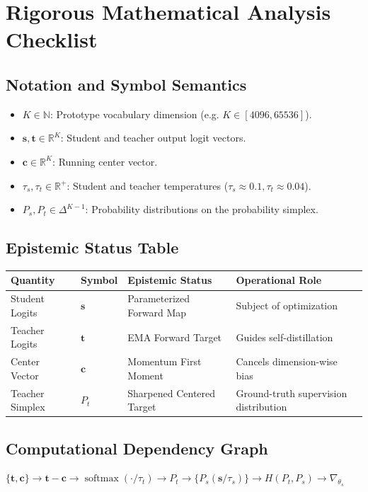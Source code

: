 \documentclass[11pt,a4paper]{article}
\theoremstyle{definition}
\begin{document}
\section{Rigorous Mathematical Analysis Checklist}

\subsection{Notation and Symbol Semantics}
\begin{itemize}
    \item $K \in \mathbb{N}$: Prototype vocabulary dimension (e.g. $K \in [4096, 65536]$).
    \item $\mathbf{s}, \mathbf{t} \in \mathbb{R}^K$: Student and teacher output logit vectors.
    \item $\mathbf{c} \in \mathbb{R}^K$: Running center vector.
    \item $\tau_s, \tau_t \in \mathbb{R}^+$: Student and teacher temperatures ($\tau_s \approx 0.1, \tau_t \approx 0.04$).
    \item $P_s, P_t \in \Delta^{K-1}$: Probability distributions on the probability simplex.
\end{itemize}

\subsection{Epistemic Status Table}
\begin{table}[h]
\centering
\small
\begin{tabular}{@{}llll@{}}
\toprule
\textbf{Quantity} & \textbf{Symbol} & \textbf{Epistemic Status} & \textbf{Operational Role} \\
\midrule
Student Logits & $\mathbf{s}$ & Parameterized Forward Map & Subject of optimization \\
Teacher Logits & $\mathbf{t}$ & EMA Forward Target & Guides self-distillation \\
Center Vector & $\mathbf{c}$ & Momentum First Moment & Cancels dimension-wise bias \\
Teacher Simplex & $P_t$ & Sharpened Centered Target & Ground-truth supervision distribution \\
\bottomrule
\end{tabular}
\end{table}

\subsection{Computational Dependency Graph}
{\centering
$\{\mathbf{t}, \mathbf{c}\} \longrightarrow \mathbf{t} - \mathbf{c} \longrightarrow \operatorname{softmax}(\cdot / \tau_t) \longrightarrow P_t \longrightarrow \{P_s(\mathbf{s}/\tau_s)\} \longrightarrow H(P_t, P_s) \longrightarrow \nabla_{\theta_s}$
\par}
\end{document}

